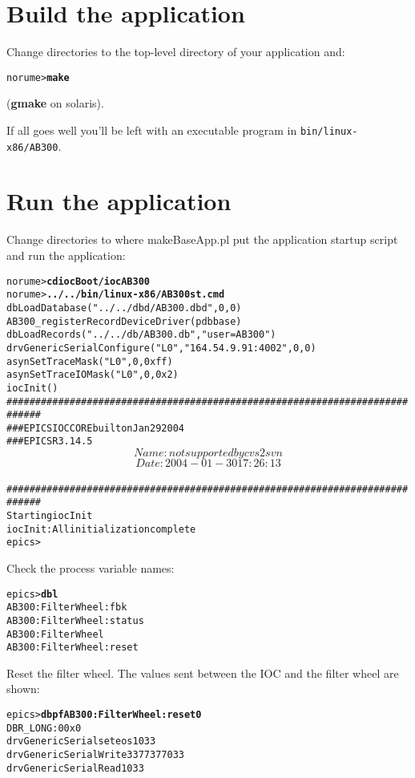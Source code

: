 \documentclass[twoside]{article}
\begin{document}
\section{Build the application}
Change directories to the top-level directory of your application and:
\begin{alltt}
norume> {\bf make}
\end{alltt}
({\bf gmake} on solaris).

If all goes well you'll be left with an executable program in
{\tt bin/linux-x86/AB300}.



\section{Run the application}
Change directories to where makeBaseApp.pl put the application startup script
and run the application:
\begin{alltt}
norume> {\bf cd iocBoot/iocAB300}
norume> {\bf ../../bin/linux-x86/AB300 st.cmd}
dbLoadDatabase("../../dbd/AB300.dbd",0,0)
AB300_registerRecordDeviceDriver(pdbbase) 
dbLoadRecords("../../db/AB300.db","user=AB300")
drvGenericSerialConfigure("L0","164.54.9.91:4002",0,0)
asynSetTraceMask("L0",0,0xff)
asynSetTraceIOMask("L0",0,0x2)
iocInit()
############################################################################
###  EPICS IOC CORE built on Jan 29 2004
###  EPICS R3.14.5 $$Name: not supported by cvs2svn $$ $$Date: 2004-01-30 17:26:13 $$
############################################################################
Starting iocInit
iocInit: All initialization complete
epics>
\end{alltt}

Check the process variable names:
\begin{alltt}
epics> {\bf dbl}
AB300:FilterWheel:fbk
AB300:FilterWheel:status
AB300:FilterWheel
AB300:FilterWheel:reset
\end{alltt}

Reset the filter wheel.  The values sent between the IOC and the filter wheel
are shown:
\begin{alltt}
epics> {\bf dbpf AB300:FilterWheel:reset 0}
DBR_LONG:           0         0x0                 
drvGenericSerial set eos 1 \verb@\@033
drvGenericSerialWrite 3 \verb@\@377\verb@\@377\verb@\@033
drvGenericSerialRead 1 \verb@\@033
\end{alltt}
\end{document}
